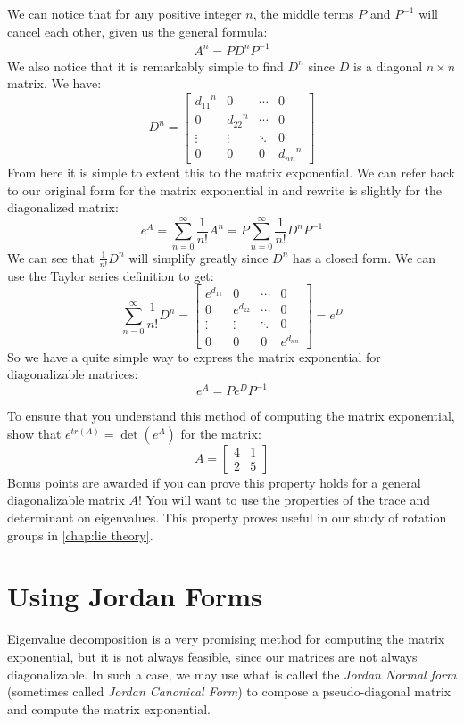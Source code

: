 We can notice that for any positive integer $n$, the middle terms $P$ and $P^{-1}$ will cancel each other, given us the general formula:
\begin{gather}
    A^n=PD^nP^{-1}
\end{gather}
We also notice that it is remarkably simple to find $D^n$ since $D$ is a diagonal $n{\times} n$ matrix. We  have:
$$D^n=\begin{bmatrix}
    {d_{11}}^n &0&\cdots&0\\
    0 &{d_{22}}^n & \cdots &0\\
    \vdots & \vdots & \ddots & 0\\
    0&0&0&{d_{nn}}^n
\end{bmatrix}$$
From here it is simple to extent this to the matrix exponential. We can refer back to our original form for the matrix exponential in  and rewrite is slightly for the diagonalized matrix:
$$e^A=\sum_{n=0}^{\infty}{\frac{1}{n!}A^n}=P\sum_{n=0}^{\infty}{\frac{1}{n!}D^n}P^{-1}$$
We can see that ${\frac{1}{n!}D^n}$ will simplify greatly since $D^n$ has a closed form. We can use the Taylor series definition to get:
$$\sum_{n=0}^{\infty}\frac{1}{n!}D^n=\begin{bmatrix}
    e^{d_{11}} &0&\cdots&0\\
    0 &e^{d_{22}} & \cdots &0\\
    \vdots & \vdots & \ddots & 0\\
    0&0&0&e^{d_{nn}}
\end{bmatrix}=e^D$$
So we have a quite simple way to express the matrix exponential for diagonalizable matrices:
$$e^A=Pe^DP^{-1}$$
\begin{exercise}[Show $e^{tr(A)}=\det\left(e^A\right)$]\label{exer:trace det}
    To ensure that you understand this method of computing the matrix exponential, show that $e^{tr(A)}=\det\left(e^A\right)$ for the matrix: $$A=\begin{bmatrix}
        4&1\\2&5
    \end{bmatrix}$$
    Bonus points are awarded if you can prove this property holds for a general diagonalizable matrix $A$! You will want to use the properties of the trace and determinant on eigenvalues. This property proves useful in our study of rotation groups in \autoref{chap:lie theory}.
\end{exercise}

\section{Using Jordan Forms}
Eigenvalue decomposition is a very promising method for computing the matrix exponential, but it is not always feasible, since our matrices are not always diagonalizable. In such a case, we may use what is called the \textit{Jordan Normal form} (sometimes called \textit{Jordan Canonical Form}) to compose a pseudo-diagonal matrix and compute the matrix exponential.

